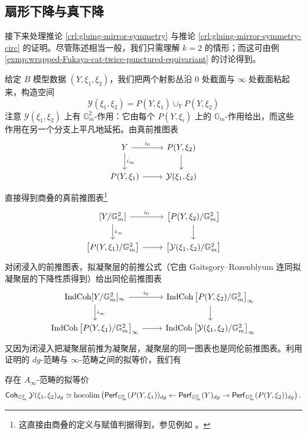 \subsection{扇形下降与真下降}

接下来处理推论 \ref{crl:gluing-mirror-symmetry} 与推论 \ref{crl:gluing-mirror-symmetry-circ} 的证明。尽管陈述相当一般，我们只需理解 $k=2$ 的情形；而这可由例 \ref{exmp:wrapped-Fukaya-cat-twice-punctured-equivariant} 的讨论得到。

给定 $B$ 模型数据 $(Y,\xi_1,\xi_2)$，我们把两个射影丛沿 $0$ 处截面与 $\infty$ 处截面粘起来，构造空间
\[
    \mathcal{Y} (\xi_1,\xi_2)=P(Y,\xi_1)\cup_Y P(Y,\xi_2)
\]
注意 $\mathcal{Y} (\xi_1,\xi_2)$ 上有 $\mathbb{G}_m^2$-作用：它由每个 $P(Y,\xi_i)$ 上的 $\mathbb{G}_m$-作用给出，而这些作用在另一个分支上平凡地延拓。由真前推图表
\[
    \begin{tikzcd}
        Y\arrow[r,"i_0"]\arrow[d,"i_{\infty}"]&P(Y,\xi_2)\arrow[d]\\ 
        P(Y,\xi_1)\arrow[r]&\mathcal{Y} (\xi_1,\xi_2)
    \end{tikzcd}
\]
直接得到商叠的真前推图表\footnote{这直接由商叠的定义与赋值判据得到，参见例如 \cite{Alper26}。} \[
    \begin{tikzcd}
        {[Y/\mathbb{G}_m^2]}\arrow[r,"i_0"]\arrow[d,"i_{\infty}"]&{\big[P(Y,\xi_2)/\mathbb{G}_m^2\big]}\arrow[d]\\ 
        \big[P(Y,\xi_1)/\mathbb{G}_m^2\big]\arrow[r]&\big[\mathcal{Y}(\xi_1,\xi_2)/\mathbb{G}_m^2\big]
    \end{tikzcd}
\]
对闭浸入的前推图表，拟凝聚层的前推公式（它由 Gaitsgory--Rozenblyum \cite[Theorem A.1.2]{GR17II} 连同拟凝聚层的下降性质得到）给出同伦前推图表 \[
    \begin{tikzcd}
        {\IndCoh [Y/\mathbb{G}_m^2]_{\infty}}\arrow[r,"i_0"]\arrow[d,"i_{\infty}"]&{\IndCoh\big[P(Y,\xi_2)/\mathbb{G}_m^2\big]_{\infty}}\arrow[d]\\ 
        \IndCoh\big[P(Y,\xi_1)/\mathbb{G}_m^2\big]_{\infty}\arrow[r]&\IndCoh\big[\mathcal{Y}(\xi_1,\xi_2)/\mathbb{G}_m^2\big]_{\infty}
    \end{tikzcd}
\]又因为闭浸入把凝聚层前推为凝聚层，凝聚层的同一图表也是同伦前推图表。利用 \cite{Cohn16} 证明的 $dg$-范畴与 $\infty$-范畴之间的拟等价，我们有

\begin{prp}\label{prp:pushforward-coherent-stack}
    存在 $A_{\infty}$-范畴的拟等价 \[
        \operatorname{\mathsf{Coh}}_{\mathbb{G}_m^2}\mathcal{Y} (\xi_1,\xi_2)_{dg}\simeq\operatorname*{hocolim}\left(\operatorname{\mathsf{Perf}}_{\mathbb{G}_m^2} (P(Y,\xi_1))_{dg}\leftarrow\operatorname{\mathsf{Perf}}_{\mathbb{G}_m^2} (Y)_{dg}\rightarrow\operatorname{\mathsf{Perf}}_{\mathbb{G}_m^2} (P(Y,\xi_2))_{dg}\right).
    \]
\end{prp}

